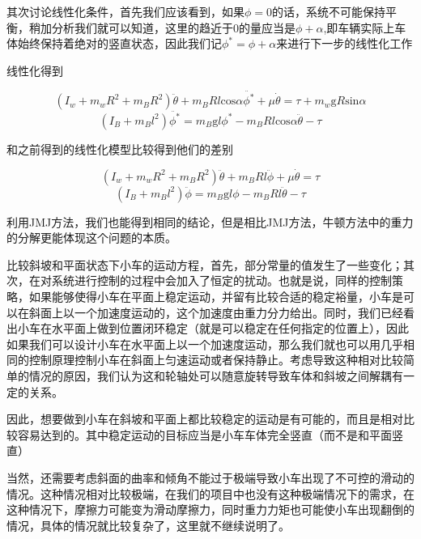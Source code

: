 \documentclass[UTF8,a4paper]{paper}
\begin{document}
其次讨论线性化条件，首先我们应该看到，如果$\phi=0$的话，系统不可能保持平衡，稍加分析我们就可以知道，这里的趋近于0的量应当是$\phi+\alpha$,即车辆实际上车体始终保持着绝对的竖直状态，因此我们记$\phi^*=\phi+\alpha$来进行下一步的线性化工作

线性化得到

\begin{equation}
(I_w+m_wR^2+m_BR^2)\ddot{\theta}+m_BRl\mathrm{cos}\alpha\ddot{\phi^*}+\mu\dot{\theta}=\tau+m_w\mathrm{g}R\mathrm{sin}\alpha
\end{equation}
\begin{equation}
(I_B+m_Bl^2)\ddot{\phi^*}=m_B\mathrm{g}l\phi^*-m_BRl\mathrm{cos}\alpha\ddot{\theta}-\tau
\end{equation}

和之前得到的线性化模型比较得到他们的差别

\begin{equation}
(I_w+m_wR^2+m_BR^2)\ddot{\theta}+m_BRl\ddot{\phi}+\mu\dot{\theta}=\tau
\label{116}
\end{equation}
\begin{equation}
(I_B+m_Bl^2)\ddot{\phi}=m_B\mathrm{g}l\phi-m_BRl\ddot{\theta}-\tau
\label{117}
\end{equation}

利用JMJ方法，我们也能得到相同的结论，但是相比JMJ方法，牛顿方法中的重力的分解更能体现这个问题的本质。

比较斜坡和平面状态下小车的运动方程，首先，部分常量的值发生了一些变化；其次，在对系统进行控制的过程中会加入了恒定的扰动。也就是说，同样的控制策略，如果能够使得小车在平面上稳定运动，并留有比较合适的稳定裕量，小车是可以在斜面上以一个加速度运动的，这个加速度由重力分力给出。同时，我们已经看出小车在水平面上做到位置闭环稳定（就是可以稳定在任何指定的位置上），因此如果我们可以设计小车在水平面上以一个加速度运动，那么我们就也可以用几乎相同的控制原理控制小车在斜面上匀速运动或者保持静止。考虑导致这种相对比较简单的情况的原因，我们认为这和轮轴处可以随意旋转导致车体和斜坡之间解耦有一定的关系。

因此，想要做到小车在斜坡和平面上都比较稳定的运动是有可能的，而且是相对比较容易达到的。其中稳定运动的目标应当是小车车体完全竖直（而不是和平面竖直）

当然，还需要考虑斜面的曲率和倾角不能过于极端导致小车出现了不可控的滑动的情况。这种情况相对比较极端，在我们的项目中也没有这种极端情况下的需求，在这种情况下，摩擦力可能变为滑动摩擦力，同时重力力矩也可能使小车出现翻倒的情况，具体的情况就比较复杂了，这里就不继续说明了。
\end{document}
